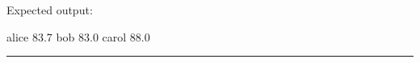 \documentclass[
  11pt,
]{article}
\newenvironment{Shaded}{}{}
\newcommand{\NormalTok}[1]{#1}
\begin{document}
Expected output:

\begin{Shaded}
\begin{Highlighting}[]
\NormalTok{alice 83.7}
\NormalTok{bob 83.0}
\NormalTok{carol 88.0}
\end{Highlighting}
\end{Shaded}

\begin{Shaded}
\begin{Highlighting}[]


\end{Highlighting}
\end{Shaded}

\begin{center}\rule{0.5\linewidth}{0.5pt}\end{center}
\end{document}
